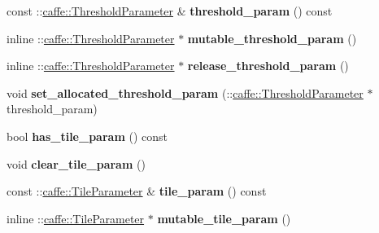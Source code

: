 \begin{DoxyCompactItemize}
\mbox{\label{classcaffe_1_1_layer_parameter_a383b9e70cb88917cee375dd3a6bc2819}} 
const \+::\mbox{\hyperlink{classcaffe_1_1_threshold_parameter}{caffe\+::\+Threshold\+Parameter}} \& {\bfseries threshold\+\_\+param} () const
\item 
\mbox{\label{classcaffe_1_1_layer_parameter_a43cf0deec916f303981a9ef8ef392f56}} 
inline \+::\mbox{\hyperlink{classcaffe_1_1_threshold_parameter}{caffe\+::\+Threshold\+Parameter}} $\ast$ {\bfseries mutable\+\_\+threshold\+\_\+param} ()
\item 
\mbox{\label{classcaffe_1_1_layer_parameter_ac08e1b4d1ec10235874b8ab5d0e3ded1}} 
inline \+::\mbox{\hyperlink{classcaffe_1_1_threshold_parameter}{caffe\+::\+Threshold\+Parameter}} $\ast$ {\bfseries release\+\_\+threshold\+\_\+param} ()
\item 
\mbox{\label{classcaffe_1_1_layer_parameter_a36f91de983767035d4661fe4b1f18554}} 
void {\bfseries set\+\_\+allocated\+\_\+threshold\+\_\+param} (\+::\mbox{\hyperlink{classcaffe_1_1_threshold_parameter}{caffe\+::\+Threshold\+Parameter}} $\ast$threshold\+\_\+param)
\item 
\mbox{\label{classcaffe_1_1_layer_parameter_a9de64522c08f7933a3b137c6c1966397}} 
bool {\bfseries has\+\_\+tile\+\_\+param} () const
\item 
\mbox{\label{classcaffe_1_1_layer_parameter_acc3401bf6f09b63cf19bda3c53a619f9}} 
void {\bfseries clear\+\_\+tile\+\_\+param} ()
\item 
\mbox{\label{classcaffe_1_1_layer_parameter_aa92afaca86d1c0a52348faf3f69b2063}} 
const \+::\mbox{\hyperlink{classcaffe_1_1_tile_parameter}{caffe\+::\+Tile\+Parameter}} \& {\bfseries tile\+\_\+param} () const
\item 
\mbox{\label{classcaffe_1_1_layer_parameter_a4f06949ed3d120af639d34cad2293482}} 
inline \+::\mbox{\hyperlink{classcaffe_1_1_tile_parameter}{caffe\+::\+Tile\+Parameter}} $\ast$ {\bfseries mutable\+\_\+tile\+\_\+param} ()
\item 

\end{DoxyCompactItemize}
